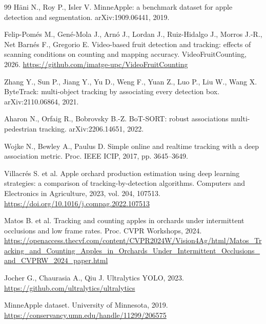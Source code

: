 \documentclass[12pt,a4paper]{article}
\begin{document}
\begin{thebibliography}{99}
H{\"a}ni N., Roy P., Isler V. MinneApple: a benchmark dataset for apple
detection and segmentation. arXiv:1909.06441, 2019.

Felip-Pom{\'e}s M., Gen{\'e}-Mola J., Arn{\'o} J., Lordan J.,
Ruiz-Hidalgo J., Morros J.-R., Net Barn{\'e}s F., Gregorio E.
Video-based fruit detection and tracking: effects of scanning conditions on
counting and mapping accuracy. VideoFruitCounting, 2026.
\url{https://github.com/imatge-upc/VideoFruitCounting}

Zhang Y., Sun P., Jiang Y., Yu D., Weng F., Yuan Z., Luo P., Liu W., Wang X.
ByteTrack: multi-object tracking by associating every detection box.
arXiv:2110.06864, 2021.

Aharon N., Orfaig R., Bobrovsky B.-Z. BoT-SORT: robust associations
multi-pedestrian tracking. arXiv:2206.14651, 2022.

Wojke N., Bewley A., Paulus D. Simple online and realtime tracking with a
deep association metric. Proc. IEEE ICIP, 2017, pp. 3645--3649.

Villacr{\'e}s S. et al. Apple orchard production estimation using deep
learning strategies: a comparison of tracking-by-detection algorithms.
Computers and Electronics in Agriculture, 2023, vol. 204, 107513.
\url{https://doi.org/10.1016/j.compag.2022.107513}

Matos B. et al. Tracking and counting apples in orchards under intermittent
occlusions and low frame rates. Proc. CVPR Workshops, 2024.
\url{https://openaccess.thecvf.com/content/CVPR2024W/Vision4Ag/html/Matos_Tracking_and_Counting_Apples_in_Orchards_Under_Intermittent_Occlusions_and_CVPRW_2024_paper.html}

Jocher G., Chaurasia A., Qiu J. Ultralytics YOLO, 2023.
\url{https://github.com/ultralytics/ultralytics}

MinneApple dataset. University of Minnesota, 2019.
\url{https://conservancy.umn.edu/handle/11299/206575}
\end{thebibliography}
\end{document}
